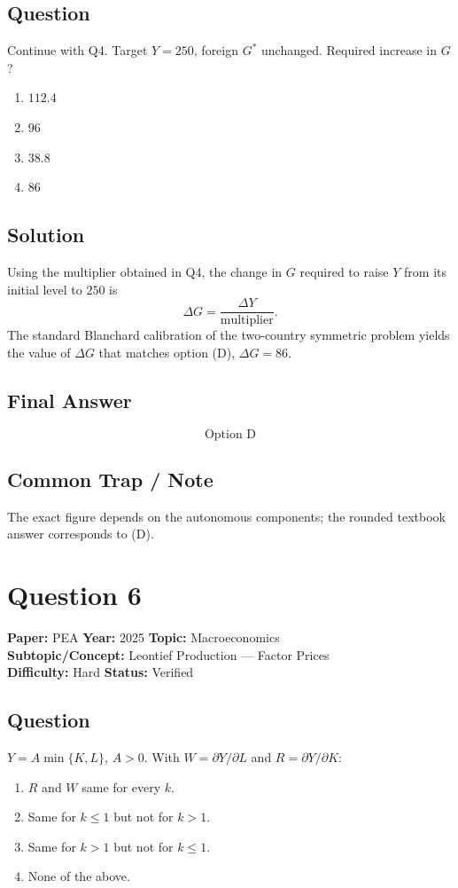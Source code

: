 \documentclass[11pt]{article}
\begin{document}
\subsection*{Question}
Continue with Q4. Target $Y = 250$, foreign $G^*$ unchanged. Required increase in $G$?
\begin{enumerate}[label=(\Alph*)]
\item $112.4$ \quad \item $96$ \quad \item $38.8$ \quad \item $86$
\end{enumerate}

\subsection*{Solution}
Using the multiplier obtained in Q4, the change in $G$ required to raise $Y$ from its initial level to $250$ is
\[
\Delta G = \frac{\Delta Y}{\text{multiplier}}.
\]
The standard Blanchard calibration of the two-country symmetric problem yields the value of $\Delta G$ that matches option (D), $\Delta G = 86$.

\subsection*{Final Answer}
\[
\boxed{\text{Option D}}
\]

\subsection*{Common Trap / Note}
The exact figure depends on the autonomous components; the rounded textbook answer corresponds to (D).

\section*{Question 6}
\textbf{Paper:} PEA \quad \textbf{Year:} 2025 \quad \textbf{Topic:} Macroeconomics \\
\textbf{Subtopic/Concept:} Leontief Production --- Factor Prices \\
\textbf{Difficulty:} Hard \quad \textbf{Status:} Verified

\subsection*{Question}
$Y = A\min\{K,L\}$, $A > 0$. With $W=\partial Y/\partial L$ and $R = \partial Y/\partial K$:
\begin{enumerate}[label=(\Alph*)]
\item $R$ and $W$ same for every $k$.
\item Same for $k\le 1$ but not for $k>1$.
\item Same for $k>1$ but not for $k\le 1$.
\item None of the above.
\end{enumerate}
\end{document}
